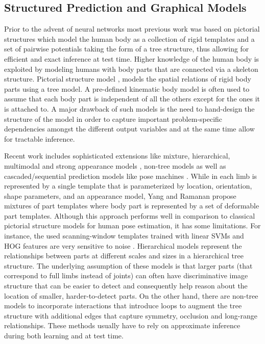 \documentclass[journal ]{IEEEtran}
\begin{document}
\subsection{Structured Prediction and Graphical Models}
Prior to the advent of neural networks most previous work was based on pictorial structures \cite{felzenszwalb2005pictorial} which model the human body as a collection of rigid templates and a set of pairwise potentials taking the form of a tree structure, thus allowing for efficient
and exact inference at test time.
Higher knowledge of the human body is exploited by modeling humans with body parts that are connected via a skeleton structure.
Pictorial structure model \cite{fischler1973representation, felzenszwalb2005pictorial}, models the spatial relations of rigid body parts using a tree model.
A pre-defined kinematic body model is often used to assume that each body part is
independent of all the others except for the ones it is attached to.
A major drawback of such models is the need to hand-design the structure of the model in order to capture important problem-specific dependencies amongst the different output variables and at the same time allow for tractable inference.

Recent work includes sophisticated extensions like mixture, hierarchical, multimodal and strong appearance models \cite{yang2013articulated, pishchulin2013poselet, tian2012exploring, sapp2013modec, pishchulin2013strong}, non-tree models \cite{karlinsky2012using, dantone2013human} as well as cascaded/sequential prediction models like pose machines \cite{ramakrishna2014pose}.
While in \cite{felzenszwalb2005pictorial} each limb is represented by a single template that is parameterized by location, orientation, shape parameters, and an appearance model, Yang and
Ramanan \cite{yang2013articulated} propose mixtures of part templates where body part is represented by
a set of deformable part templates.
Although this approach performs well in comparison to classical pictorial structure
models for human pose estimation, it has some limitations. For instance, the used
scanning-window templates trained with linear SVMs and HOG features \cite{dalal2005histograms} are very
sensitive to noise \cite{zhu2012we}.
Hierarchical models \cite{sun2011articulated, tian2012exploring} represent the relationships between parts at different scales and sizes in a hierarchical tree structure. The underlying assumption of these models is that larger parts (that correspond to full limbs instead of joints) can often have discriminative image structure that can be easier to detect and consequently help reason about the location of smaller, harder-to-detect parts. On the other hand, there are non-tree models \cite{dantone2013human, karlinsky2012using} to incorporate interactions that introduce loops to augment the tree structure with additional edges that capture symmetry, occlusion and long-range relationships. These methods usually have to rely on approximate inference during both learning and at test time.
\end{document}

